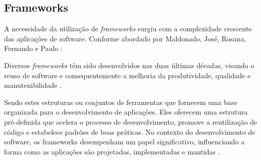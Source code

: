 \subsection{Frameworks}
A necessidade da utilização de \textit{frameworks} surgiu com a complexidade crescente das aplicações de software.
Conforme abordado por Maldonado, José, Rosana, Fernando e Paulo : 
\begin{citacao}
	Diversos \textit{frameworks} têm sido desenvolvidos nas duas últimas décadas, visando o
	reuso de software e consequentemente a melhoria da produtividade, qualidade e
	manutenibilidade \cite{maldonado2002padroes}.
\end{citacao}
Sendo estes estruturas ou conjuntos de ferramentas que fornecem uma base organizada para o desenvolvimento de aplicações. Eles oferecem uma estrutura pré-definida que acelera o processo de desenvolvimento, promove a reutilização de código e estabelece padrões de boas práticas. No contexto do desenvolvimento de software, os frameworks desempenham um papel significativo, influenciando a forma como as aplicações são projetadas, implementadas e mantidas \cite{maldonado2002padroes}.

